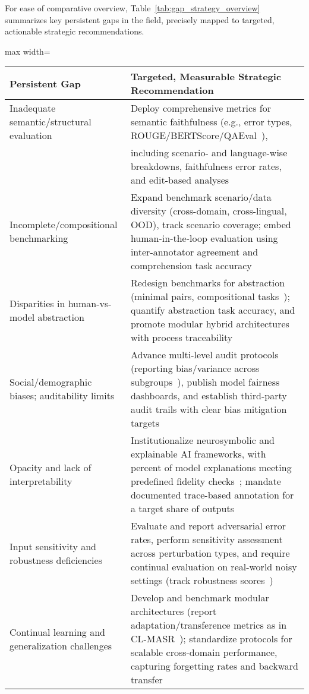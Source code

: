 \documentclass[sigconf]{acmart}
\begin{document}
For ease of comparative overview, Table~\ref{tab:gap_strategy_overview} summarizes key persistent gaps in the field, precisely mapped to targeted, actionable strategic recommendations.

\begin{table*}[htbp]
\centering
\caption{Persistent Gaps and Matched Strategic Recommendations with Measurable Objectives}
\label{tab:gap_strategy_overview}
\begin{adjustbox}{max width=\textwidth}
\begin{tabular}{ll}
\toprule
\textbf{Persistent Gap} & \textbf{Targeted, Measurable Strategic Recommendation} \\
\midrule
Inadequate semantic/structural evaluation & Deploy comprehensive metrics for semantic faithfulness (e.g., error types, ROUGE/BERTScore/QAEval~\cite{ref81,ref76}), \\ & including scenario- and language-wise breakdowns, faithfulness error rates, and edit-based analyses~\cite{ref76,ref97} \\
Incomplete/compositional benchmarking & Expand benchmark scenario/data diversity (cross-domain, cross-lingual, OOD), track scenario coverage; embed human-in-the-loop evaluation using inter-annotator agreement and comprehension task accuracy~\cite{ref78,ref81,ref97,ref106} \\
Disparities in human-vs-model abstraction & Redesign benchmarks for abstraction (minimal pairs, compositional tasks~\cite{ref99}); quantify abstraction task accuracy, and promote modular hybrid architectures with process traceability~\cite{ref12,ref92} \\
Social/demographic biases; auditability limits & Advance multi-level audit protocols (reporting bias/variance across subgroups~\cite{ref94}), publish model fairness dashboards, and establish third-party audit trails with clear bias mitigation targets \\
Opacity and lack of interpretability & Institutionalize neurosymbolic and explainable AI frameworks, with percent of model explanations meeting predefined fidelity checks~\cite{ref93,ref84}; mandate documented trace-based annotation for a target share of outputs \\
Input sensitivity and robustness deficiencies & Evaluate and report adversarial error rates, perform sensitivity assessment across perturbation types, and require continual evaluation on real-world noisy settings (track robustness scores~\cite{ref78,ref105}) \\
Continual learning and generalization challenges & Develop and benchmark modular architectures (report adaptation/transference metrics as in CL-MASR~\cite{ref102}); standardize protocols for scalable cross-domain performance, capturing forgetting rates and backward transfer \\

\end{tabular}
\end{adjustbox}
\end{table*}
\end{document}
